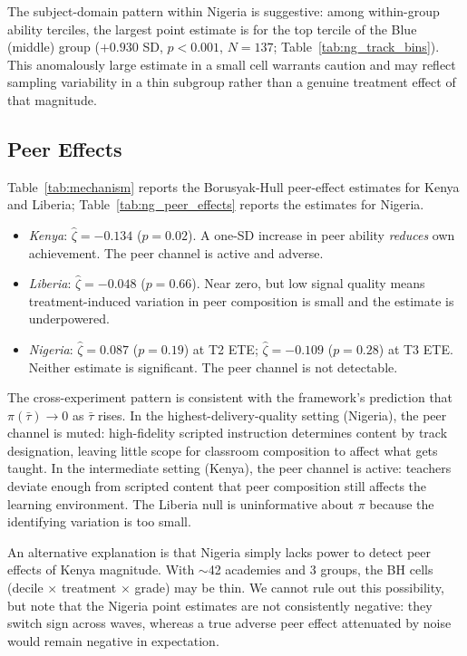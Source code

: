 \documentclass[11pt]{article}
\begin{document}
The subject-domain pattern within Nigeria is suggestive: among within-group ability terciles, the largest point estimate is for the top tercile of the Blue (middle) group ($+0.930$ SD, $p < 0.001$, $N = 137$; Table~\ref{tab:ng_track_bins}). This anomalously large estimate in a small cell warrants caution and may reflect sampling variability in a thin subgroup rather than a genuine treatment effect of that magnitude.

\subsection{Peer Effects}

Table~\ref{tab:mechanism} reports the Borusyak-Hull peer-effect estimates for Kenya and Liberia; Table~\ref{tab:ng_peer_effects} reports the estimates for Nigeria.

\begin{itemize}
\item \emph{Kenya}: $\hat{\zeta} = -0.134$ ($p = 0.02$). A one-SD increase in peer ability \emph{reduces} own achievement. The peer channel is active and adverse.

\item \emph{Liberia}: $\hat{\zeta} = -0.048$ ($p = 0.66$). Near zero, but low signal quality means treatment-induced variation in peer composition is small and the estimate is underpowered.

\item \emph{Nigeria}: $\hat{\zeta} = 0.087$ ($p = 0.19$) at T2 ETE; $\hat{\zeta} = -0.109$ ($p = 0.28$) at T3 ETE. Neither estimate is significant. The peer channel is not detectable.
\end{itemize}

The cross-experiment pattern is consistent with the framework's prediction that $\pi(\bar{\tau}) \to 0$ as $\bar{\tau}$ rises. In the highest-delivery-quality setting (Nigeria), the peer channel is muted: high-fidelity scripted instruction determines content by track designation, leaving little scope for classroom composition to affect what gets taught. In the intermediate setting (Kenya), the peer channel is active: teachers deviate enough from scripted content that peer composition still affects the learning environment. The Liberia null is uninformative about $\pi$ because the identifying variation is too small.

An alternative explanation is that Nigeria simply lacks power to detect peer effects of Kenya magnitude. With $\sim$42 academies and 3 groups, the BH cells (decile $\times$ treatment $\times$ grade) may be thin. We cannot rule out this possibility, but note that the Nigeria point estimates are not consistently negative: they switch sign across waves, whereas a true adverse peer effect attenuated by noise would remain negative in expectation.
\end{document}
